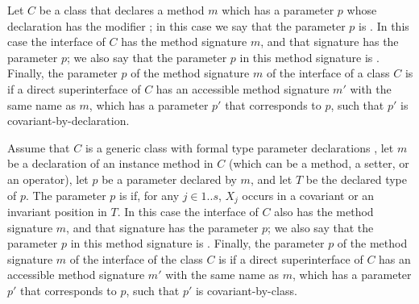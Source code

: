 \documentclass[makeidx]{article}
\begin{document}


\LMHash{}%
%
Let $C$ be a class that declares
a method $m$ which has
a parameter $p$ whose declaration has the modifier \COVARIANT;
in this case we say that the parameter $p$ is
.
%
In this case the interface of $C$ has the method signature $m$,
and that signature has the parameter $p$;
we also say that the parameter $p$ in this method signature is
.
%
Finally, the parameter $p$ of the method signature $m$
of the interface of a class $C$ is
if a direct superinterface of $C$
has an accessible method signature $m'$ with the same name as $m$,
which has a parameter $p'$ that corresponds to $p$,
such that $p'$ is covariant-by-declaration.

\LMHash{}%
Assume that $C$ is a generic class
with formal type parameter declarations
,
%
let $m$ be a declaration of an instance method in $C$
(which can be a method, a setter, or an operator),
let $p$ be a parameter declared by $m$, and
let $T$ be the declared type of $p$.
%
The parameter $p$ is
if, for any $j \in 1 .. s$,
$X_j$ occurs in a covariant or an invariant position in $T$.
%
In this case the interface of $C$ also has the method signature $m$,
and that signature has the parameter $p$;
we also say that the parameter $p$ in this method signature is
.
Finally, the parameter $p$ of the method signature $m$
of the interface of the class $C$ is
if a direct superinterface of $C$
has an accessible method signature $m'$ with the same name as $m$,
which has a parameter $p'$ that corresponds to $p$,
such that $p'$ is covariant-by-class.
\end{document}
